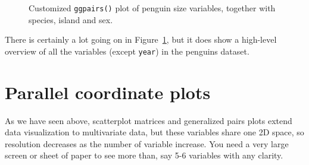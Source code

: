 \documentclass[
  letterpaper,
  10pt,
  krantz2]{krantz}
\begin{document}
\begin{figure}[H]


\caption{\label{fig-peng-ggpairs7}Customized \texttt{ggpairs()} plot of
penguin size variables, together with species, island and sex.}

\end{figure}%

There is certainly a lot going on in Figure~\ref{fig-peng-ggpairs7}, but
it does show a high-level overview of all the variables (except
\texttt{year}) in the penguins dataset.

\section{Parallel coordinate plots}\label{sec-parcoord}

As we have seen above, scatterplot matrices and generalized pairs plots
extend data visualization to multivariate data, but these variables
share one 2D space, so resolution decreases as the number of variable
increase. You need a very large screen or sheet of paper to see more
than, say 5-6 variables with any clarity.
\end{document}
